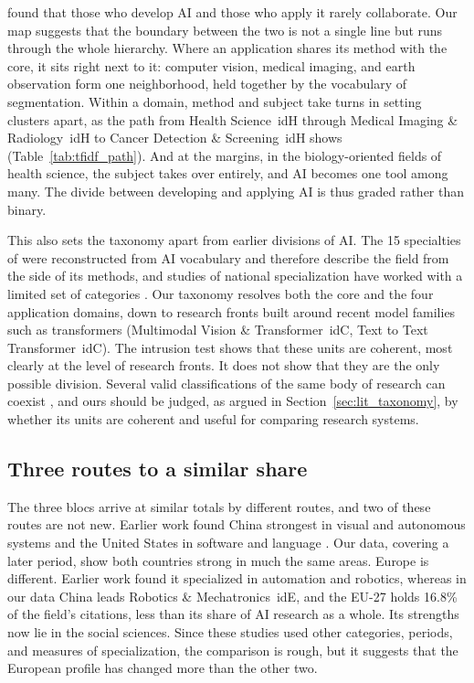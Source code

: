 \documentclass[10pt,twocolumn,a4paper]{article}
\newcommand{\cl}[3]{\textsf{#1}~\csname id#2\endcsname{#3}}
\begin{document}
	\textcite{gargiulo2022cartography} found that those who develop AI and those who apply it rarely collaborate. Our map suggests that the boundary between the two is not a single line but runs through the whole hierarchy. Where an application shares its method with the core, it sits right next to it: computer vision, medical imaging, and earth observation form one neighborhood, held together by the vocabulary of segmentation. Within a domain, method and subject take turns in setting clusters apart, as the path from \cl{Health Science}{H}{1} through \cl{Medical Imaging \& Radiology}{H}{10} to \cl{Cancer Detection \& Screening}{H}{102} shows (Table~\ref{tab:tfidf_path}). And at the margins, in the biology-oriented fields of health science, the subject takes over entirely, and AI becomes one tool among many. The divide between developing and applying AI is thus graded rather than binary.
	
	This also sets the taxonomy apart from earlier divisions of AI. The 15 specialties of \textcite{gargiulo2022cartography} were reconstructed from AI vocabulary and therefore describe the field from the side of its methods, and studies of national specialization have worked with a limited set of categories \parencite{righi2020ai,yu2023discovering}. Our taxonomy resolves both the core and the four application domains, down to research fronts built around recent model families such as transformers (\cl{Multimodal Vision \& Transformer}{C}{002}, \cl{Text to Text Transformer}{C}{010}). The intrusion test shows that these units are coherent, most clearly at the level of research fronts. It does not show that they are the only possible division. Several valid classifications of the same body of research can coexist \parencite{rafols_2025_multiple_ontologies}, and ours should be judged, as argued in Section~\ref{sec:lit_taxonomy}, by whether its units are coherent and useful for comparing research systems.
	
	\subsection{Three routes to a similar share}
	\label{sec:disc_profiles}
	
	The three blocs arrive at similar totals by different routes, and two of these routes are not new. Earlier work found China strongest in visual and autonomous systems and the United States in software and language \parencite{righi2020ai,yu2023discovering}. Our data, covering a later period, show both countries strong in much the same areas. Europe is different. Earlier work found it specialized in automation and robotics, whereas in our data China leads \cl{Robotics \& Mechatronics}{E}{45}, and the EU-27 holds 16.8\% of the field's citations, less than its share of AI research as a whole. Its strengths now lie in the social sciences. Since these studies used other categories, periods, and measures of specialization, the comparison is rough, but it suggests that the European profile has changed more than the other two.
	
\end{document}
